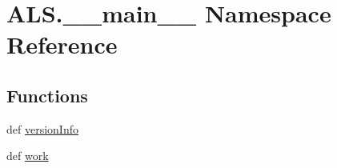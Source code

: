 \hypertarget{namespace_a_l_s_1_1____main____}{\section{A\+L\+S.\+\_\+\+\_\+main\+\_\+\+\_\+ Namespace Reference}
\label{namespace_a_l_s_1_1____main____}
}
\subsection*{Functions}
\begin{DoxyCompactItemize}
\item 
def \hyperlink{namespace_a_l_s_1_1____main_____af889c89bbfb175ee2f1ae173a2619946}{version\+Info}
\item 
def \hyperlink{namespace_a_l_s_1_1____main_____a4d3258d1ab0bf9938dc59b082a6d4ace}{work}
\end{DoxyCompactItemize}
